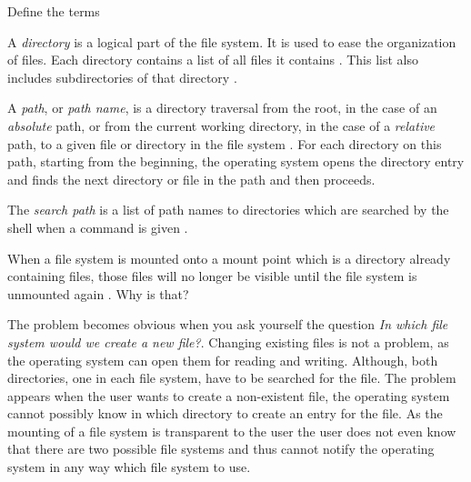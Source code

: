 \documentclass[a4paper]{miunasgn}
\begin{document}
\begin{questions}
	\question\label{q:directories}
	Define the terms
	\begin{solution}
		A \emph{directory} is a logical part of the file system.
		It is used to ease the organization of files.
		Each directory contains a list of all files it contains \cite[p.  
		435]{Silberschatz2009osc}.
		This list also includes subdirectories of that directory \cite[p.  
		439]{Silberschatz2009osc}.

		A \emph{path}, or \emph{path name}, is a directory traversal from the root, 
		in the case of an \emph{absolute} path, or from the current working 
		directory, in the case of a \emph{relative} path, to a given file or 
		directory in the file system \cite[p.  439]{Silberschatz2009osc}.
		For each directory on this path, starting from the beginning, the operating 
		system opens the directory entry and finds the next directory or file in 
		the path and then proceeds.

		The \emph{search path} is a list of path names to directories which are 
		searched by the shell when a command is given \cite[p.  
		438]{Silberschatz2009osc}.
	\end{solution}

	\question\label{q:mounting}
	When a file system is mounted onto a mount point which is a directory already 
	containing files, those files will no longer be visible until the file system 
	is unmounted again \cite[pp. 444--445]{Silberschatz2009osc}.
	Why is that?
	\begin{solution}
		The problem becomes obvious when you ask yourself the question \emph{In 
		which file system would we create a new file?}.
		Changing existing files is not a problem, as the operating system can open 
		them for reading and writing.
		Although, both directories, one in each file system, have to be searched 
		for the file.
		The problem appears when the user wants to create a non-existent file, the 
		operating system cannot possibly know in which directory to create an entry 
		for the file.
		As the mounting of a file system is transparent to the user the user does 
		not even know that there are two possible file systems and thus cannot 
		notify the operating system in any way which file system to use.


\end{solution}
\end{questions}
\end{document}
